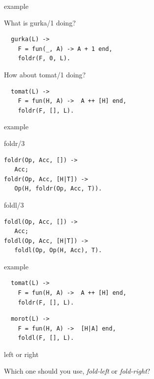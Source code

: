 \begin{frame}[fragile]{example}

\pause What is gurka/1 doing?

\pause\vspace{20pt}

\begin{verbatim}
  gurka(L) -> 
    F = fun(_, A) -> A + 1 end,
    foldr(F, 0, L).
\end{verbatim}

\pause\vspace{20pt}
\pause How about tomat/1 doing?

\pause\vspace{10pt}
\begin{verbatim}
  tomat(L) -> 
    F = fun(H, A) ->  A ++ [H] end,
    foldr(F, [], L).
\end{verbatim}
\end{frame}

\begin{frame}[fragile]{example}
     \begin{block}{foldr/3}
       \begin{verbatim}
foldr(Op, Acc, []) ->
   Acc;
foldr(Op, Acc, [H|T]) ->
   Op(H, foldr(Op, Acc, T)).
       \end{verbatim}
       \vfill
     \end{block}
\pause

     \begin{block}{foldl/3}
       \begin{verbatim}
foldl(Op, Acc, []) ->
   Acc;
foldl(Op, Acc, [H|T]) ->
   foldl(Op, Op(H, Acc), T).
       \end{verbatim}
     \end{block}
\end{frame}


\begin{frame}[fragile]{example}

\pause\vspace{10pt}
\begin{verbatim}
  tomat(L) -> 
    F = fun(H, A) ->  A ++ [H] end,
    foldr(F, [], L).
\end{verbatim}
\pause 
\begin{verbatim}
  morot(L) -> 
    F = fun(H, A) ->  [H|A] end,
    foldl(F, [], L).
\end{verbatim}
\end{frame}

\begin{frame}{left or right}

Which one should you use, {\em fold-left} or {\em fold-right}?

\end{frame}

